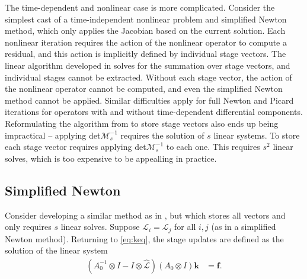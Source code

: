 \documentclass[review]{siamart}
\begin{document}
The time-dependent and nonlinear case is more complicated. Consider
the simplest cast of a time-independent nonlinear problem and simplified Newton method,
which only applies the Jacobian based on the current solution. Each
nonlinear iteration requires the action of the nonlinear operator to compute a residual,
and this action is implicitly defined by individual stage vectors. The linear algorithm
developed in  solves for the summation over stage vectors, and individual
stages cannot be extracted. Without each stage vector, the action of the nonlinear 
operator cannot be computed, and even the simplified Newton method cannot be applied.
Similar difficulties apply for full Newton and Picard iterations for operators with
and without time-dependent differential components. Reformulating the algorithm
from  to store stage vectors also ends up being impractical --
applying det$\mathcal{M}_s^{-1}$ requires the solution of $s$ linear systems. To store
each stage vector requires applying det$\mathcal{M}_s^{-1}$ to each one. This
requires $s^2$ linear solves, which is too expensive to be appealling in practice.


\subsection{Simplified Newton}\label{sec:nonlinear:simp}

Consider developing a similar method as in , but which stores all
vectors and only requires $s$ linear solves. Suppose $\mathcal{L}_i = \mathcal{L}_j$
for all $i,j$ (as in a simplified Newton method). Returning to \eqref{eq:keq}, the
stage updates are defined as the solution of the linear system
%
\begin{align}\label{eq:keq2}
\left( A_0^{-1}\otimes I - I\otimes\widehat{\mathcal{L}}\right)
	(A_0\otimes I) \mathbf{k} & = \mathbf{f}.
\end{align}
%
\end{document}
